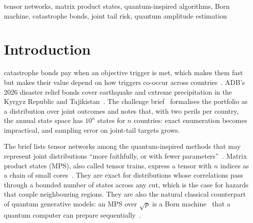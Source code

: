 \documentclass[conference]{IEEEtran}
\begin{document}
\begin{IEEEkeywords}
tensor networks, matrix product states, quantum-inspired algorithms, Born machine, catastrophe bonds, joint tail risk, quantum amplitude estimation
\end{IEEEkeywords}

\section{Introduction}
 catastrophe bonds pay when an objective trigger is met, which makes them fast but makes
their value depend on how triggers co-occur across countries~\cite{brief}. ADB's 2026 disaster relief bonds cover
earthquake and extreme precipitation in the Kyrgyz Republic and Tajikistan~\cite{adbbond}. The challenge
brief~\cite{brief} formalises the portfolio as a distribution over joint outcomes and notes that, with two perils
per country, the annual state space has $10^{n}$ states for $n$ countries: exact enumeration becomes impractical, and
sampling error on joint-tail targets grows.

The brief lists tensor networks among the quantum-inspired methods that may represent joint distributions ``more
faithfully, or with fewer parameters''~\cite{brief}. Matrix product states (MPS), also called tensor trains, express a
tensor with $n$ indices as a chain of small cores~\cite{orus2014,oseledets2011}. They are exact for distributions whose
correlations pass through a bounded number of states across any cut, which is the case for hazards that couple
neighbouring regions. They are also the natural classical counterpart of quantum generative models: an MPS over
$\sqrt{p}$ is a Born machine~\cite{han2018} that a quantum computer can prepare sequentially~\cite{schon2005}.
\end{document}
